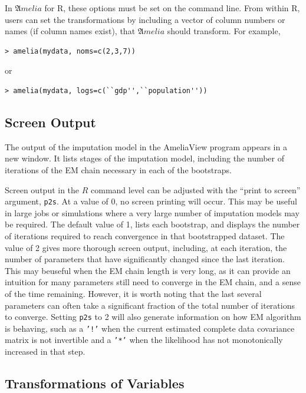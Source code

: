 \documentclass[12pt,titlepage]{article}
\newcommand{\Amelia}{\ensuremath{\mathfrak Amelia} }
\begin{document}
In \Amelia for R, these options must be set on the command line.  From
within R, users can set the transformations by including a vector of
column numbers or names (if column names exist), that \Amelia should
transform.  For example,

\begin{verbatim}
> amelia(mydata, noms=c(2,3,7))
\end{verbatim}
or
\begin{verbatim}
> amelia(mydata, logs=c(``gdp'',``population''))
\end{verbatim}

\subsection{Screen Output}
The output of the imputation model in the AmeliaView program appears
in a new window.  It lists stages of the imputation model, including
the number of iterations of the EM chain necessary in each of the
bootstraps.

Screen output in the $R$ command level can be adjusted with the ``print to
screen'' argument, \texttt{p2s}.  At a value of 0, no screen printing will
occur.  This may be useful in large jobs or simulations where a very large
number of imputation models may be required.  The default value of 1, lists each
bootstrap, and displays the number of iterations required to reach convergence
in that bootstrapped dataset.  The value of 2 gives more thorough screen output,
including, at each iteration, the number of parameters that have significantly
changed since the last iteration.  This may beuseful when the EM chain length is
very long, as it can provide an intuition for many parameters still need to
converge in the EM chain, and a sense of the time remaining.  However, it is
worth noting that the last several parameters can often take a significant
fraction of the total number of iterations to converge.  Setting \texttt{p2s} to
2 will also generate information on how EM algorithm is behaving, such as a
\texttt{'!'} when the current estimated complete data covariance matrix is not
invertible and a \texttt{'*'} when the likelihood has not monotonically
increased in that step.  

\subsection{Transformations of Variables}
\label{sec:trans}
\end{document}
